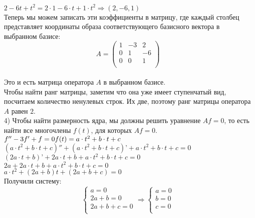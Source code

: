 \documentclass{article}
\begin{document}
    $2 - 6t + t^2 = 2  \cdot  1 - 6  \cdot  t + 1  \cdot  t^2 \Rightarrow (2, -6, 1)$\\
    Теперь мы можем записать эти коэффициенты в матрицу, где каждый
    столбец представляет координаты образа соответствующего базисного
    вектора в выбранном базисе:
    \\
    \begin{equation*}
        A =
        \begin{pmatrix}
            1& -3& 2\\
            0& 1& -6\\
            0& 0& 1\\
        \end{pmatrix}
    \end{equation*}
    \\
    Это и есть матрица оператора $A$ в выбранном базисе. \\
    Чтобы найти ранг матрицы, заметим что она уже имеет ступенчатый вид,
    посчитаем количество ненулевых строк. Их две, поэтому ранг матрицы
    оператора $A$ равен $2$. \\
    4) Чтобы найти размерность ядра, мы должны решить уравнение $Af=0$,
    то есть найти все многочлены $f(t)$, для которых $Af=0$.\\
    $f'' - 3f' + f = 0 \\
    f(t) = a  \cdot  t^2 + b \cdot  t + c$\\
    $(a  \cdot  t^2 + b \cdot  t + c)'' + (a  \cdot  t^2 + b \cdot  t + c)’ + a  \cdot  t^2 + b \cdot  t + c = 0$\\
    $(2a  \cdot  t + b)’ + 2a  \cdot  t + b + a  \cdot  t^2 + b \cdot  t + c = 0$\\
    $2a + 2a  \cdot  t + b + a  \cdot  t^2 + b \cdot  t + c = 0$\\
    $a  \cdot  t^2 + (2a + b) t + (2a + b + c) = 0$\\
    Получили систему:\\
    \begin{equation*}
            \begin{cases}
                a = 0 \\
                2a + b = 0 \\
                2a + b + c = 0 \\
            \end{cases}
            \Rightarrow
            \begin{cases}
                a = 0 \\
                b = 0 \\
                c = 0 \\
            \end{cases}
        \end{equation*}
\end{document}
